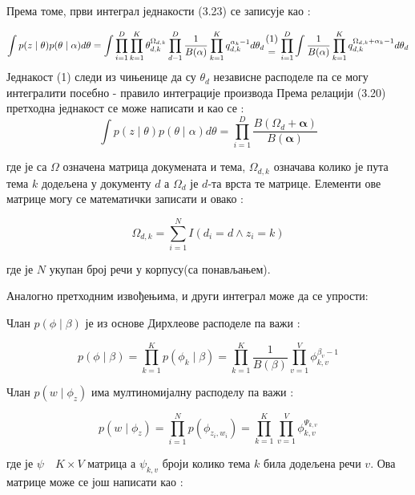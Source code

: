Према томе, први интеграл једнакости (3.23) се записује као :


\begin{equation}
	 \int p(z \mid \theta)p(\theta \mid \alpha)d\theta = \int \prod_{i=1}^D \prod_{k=1}^K \theta_{d,k}^{\Omega_{d,k}} \prod_{d-1}^D \frac{1}{B(\alpha)}\prod_{k=1}^K q_{d,k}^{\alpha_k -1}d\theta_d {(1) \atop = } \prod_{i=1}^D \int \frac{1}{B(\alpha)}\prod_{k=1}^K q_{d,k}^{\Omega_{d,k} +\alpha_k -1}d\theta_d 
\end{equation}
Једнакост (1) следи из чињенице да су $\theta_d $ независне расподеле па се могу интегралити посебно - правило интеграције производа
Према релацији (3.20) претходна једнакост се може написати и као се :
\begin{equation}
 \int p(z \mid \theta)p(\theta \mid \alpha)d\theta = \prod_{i=1}^D \frac{B(\Omega_d+\mathbf{\alpha})}{B(\mathbf{\alpha})}
\end{equation}

где је са $\Omega$ означена матрица докумената и тема, $\Omega_{d,k}$ означава колико је пута тема $k$ додељена у документу $d$ а $\Omega_d$ је $d$-та врста те матрице. Елементи ове матрице могу се математички записати и овако :

\begin{equation}
\Omega_{d,k} = \sum_{i=1}^N I(d_i=d \wedge z_i=k)
\end{equation}

где је $N$ укупан број речи у корпусу(са понављањем).

Аналогно претходним извођењима, и други интеграл може да се упрости:

Члан $p(\phi \mid \beta)$ је из основе Дирхлеове расподеле па важи :

\begin{equation}
p(\phi \mid \beta) = \prod_{k=1}^K p(\phi_k \mid \beta) = \prod_{k=1}^K \frac{1}{B(\beta)}\prod_{v=1}^V \phi_{k,v}^{\beta_v-1}
\end{equation}

Члан $p(w\mid\phi_z)$ има мултиномијалну расподелу па важи :

\begin{equation}
p(w\mid\phi_z) = \prod_{i=1}^N p(\phi_{z_i,w_i}) = \prod_{k=1}^K\prod_{v=1}^V\phi_{k,v}^{\Psi_{k,v}}
\end{equation}

где је $\psi \quad K \times V$ матрица а $\psi_{k,v}$ броји колико тема $k$ била додељена речи $v$. Ова матрице може се још написати као :

